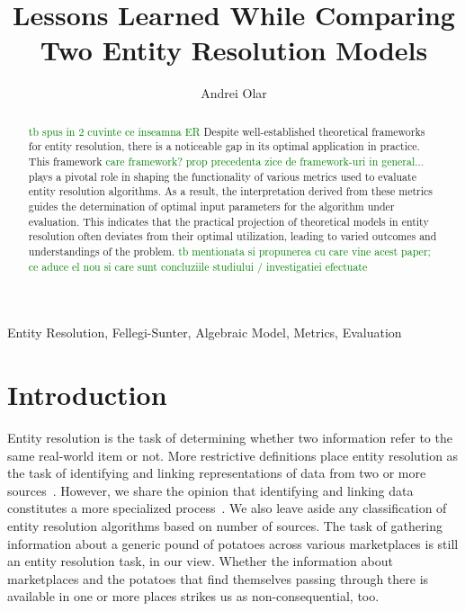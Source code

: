 \documentclass[journal]{IEEEtran}
\begin{document}
    \title{Lessons Learned While Comparing Two Entity Resolution Models}
    \author{Andrei Olar}

    \maketitle

    \theoremstyle{definition}
    \newtheorem{defn}{Definition}[section]
    
    \maketitle
    \begin{abstract}
        \textcolor{green}{tb spus in 2 cuvinte ce inseamna ER}
        Despite well-established theoretical frameworks for entity resolution,
        there is a noticeable gap in its optimal application in practice.
        This framework 
        \textcolor{green}{care framework? prop precedenta zice de framework-uri in general...}
        plays a pivotal role in shaping the functionality of
        various metrics used to evaluate entity resolution algorithms.
        As a result, the interpretation derived from these metrics guides the
        determination of optimal input parameters for the algorithm under
        evaluation.
        This indicates that the practical projection of theoretical models in
        entity resolution often deviates from their optimal utilization, leading
        to varied outcomes and understandings of the problem.
        \textcolor{green}{tb mentionata si propunerea cu care vine acest paper; ce aduce el nou si care sunt concluziile studiului / investigatiei efectuate}
    \end{abstract}

    \begin{IEEEkeywords}
        Entity Resolution, Fellegi-Sunter, Algebraic Model, Metrics, Evaluation
    \end{IEEEkeywords}

    \section{Introduction}\label{sec:introduction}
    Entity resolution is the task of determining whether two information refer
    to the same real-world item or not.
    More restrictive definitions place entity resolution as the task of
    identifying and linking representations of data from two or more
    sources~\cite{Qia17}.
    However, we share the opinion that identifying and linking data constitutes
    a more specialized process~\cite{Tal11}.
    We also leave aside any classification of entity resolution algorithms based
    on number of sources.
    The task of gathering information about a generic pound of potatoes across
    various marketplaces is still an entity resolution task, in our view.
    Whether the information about marketplaces and the potatoes that find
    themselves passing through there is available in one or more places strikes
    us as non-consequential, too.
    
\end{document}
